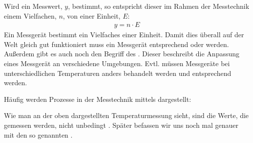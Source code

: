 \documentclass[letterpaper,10pt,english]{jupyterBook}
\begin{document}
\sphinxAtStartPar
{}

\sphinxAtStartPar
Wird ein Messwert, \(y\), bestimmt, so entspricht dieser im Rahmen der Messtechnik einem Vielfachen, \(n\), von einer Einheit, \(E\):
\begin{equation*}
\begin{split} y = n \cdot E\end{split}
\end{equation*}
\sphinxAtStartPar
Ein Messgerät bestimmt ein Vielfaches einer Einheit. Damit dies überall auf der Welt gleich gut funktioniert muss ein Messgerät entsprechend  oder  werden.
Außerdem gibt es auch noch den Begriff des . Dieser beschreibt die Anpassung eines Messgerät an verschiedene Umgebungen. Evtl. müssen Messgeräte bei unterschiedlichen Temperaturen anders behandelt werden und entsprechend  werden.

\sphinxAtStartPar
Häufig werden Prozesse in der Messtechnik mittels  dargestellt:

\sphinxAtStartPar
{}

\sphinxAtStartPar
Wie man an der oben dargestellten Temperaturmessung sieht, sind die Werte, die gemessen werden, nicht unbedingt . Später befassen wir uns noch mal genauer mit den so genannten {\hyperref[\detokenize{content/1_Messunsicherheiten::doc}]{}}.
\end{document}
